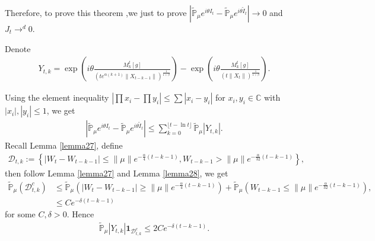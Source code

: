 \documentclass[12pt, a4paper]{amsart}
\theoremstyle{definition}
\numberwithin{equation}{section}
\begin{document}
    Therefore, to prove this theorem ,we just to prove $\left|\mathbb{\tilde{P}}_{\mu}e^{i\theta I_t}-\mathbb{\tilde{P}}_{\mu}e^{i\theta\tilde{I}_t}\right|\rightarrow 0$ and $J_t\rightarrow^d 0$.

    Denote
    \begin{align*}
        Y_{t,k}=\exp\left(i\theta\frac{M_k^t[g]}{(t e^{\alpha(k+1)}\|X_{t-k-1}\|)^{\frac{1}{1+\beta}}}\right)-\exp\left(i\theta\frac{M_k^t[g]}{\left(t\|X_t\|\right)^{\frac{1}{1+\beta}}}\right).
    \end{align*}

    Using the element inequality $|\prod x_i-\prod y_i|\leq\sum |x_i-y_i|$ for $x_i,y_i \in \mathbb{C}$ with $|x_i|,|y_i|\leq 1$, we get
    \begin{align*}
        \left|\mathbb{\tilde{P}}_{\mu}e^{i\theta I_t}-\mathbb{\tilde{P}}_{\mu}e^{i\theta\tilde{I}_t}\right|\leq \sum_{k=0}^{\lfloor t-\ln t \rfloor}\mathbb{\tilde{P}}_{\mu}|Y_{t,k}|.
    \end{align*}
    Recall Lemma \ref{lemma27}, define
    \begin{align*}
        \mathcal{D}_{t,k}:=\left\{|W_t-W_{t-k-1}|\leq \|\mu\| e^{-\frac{\alpha}{4}(t-k-1)}, W_{t-k-1}>\|\mu\|e^{-\frac{\alpha}{32}(t-k-1)}\right\},
    \end{align*}
    then follow Lemma \ref{lemma27} and Lemma \ref{lemma28}, we get
    \begin{align*}
        \mathbb{\tilde{P}}_{\mu}(\mathcal{D}_{t,k}^c)&\leq \mathbb{\tilde{P}}_{\mu}(|W_t-W_{t-k-1}|\geq \|\mu\| e^{-\frac{\alpha}{4}(t-k-1)})+\mathbb{\tilde{P}}_{\mu}(W_{t-k-1}\leq \|\mu\|e^{-\frac{\alpha}{32}(t-k-1)}),\\
        &\leq C e^{-\delta(t-k-1)}
    \end{align*}
    for some $C,\delta>0$. Hence
    \begin{align}
        \mathbb{\tilde{P}}_{\mu}|Y_{t,k}|\mathbf{1}_{\mathcal{D}^c_{t,k}}\leq 2 C e^{-\delta(t-k-1)}.\label{thm121}
    \end{align}
\end{document}
